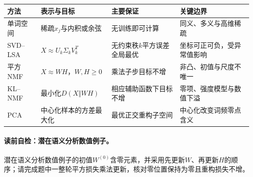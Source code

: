 \begin{comparisonbox}
\small
\begin{tabularx}{\linewidth}{@{}l X X X@{}}
\toprule 方法 & 表示与目标 & 主要保证 & 关键边界\\ \midrule
单词空间 & 稀疏$x_j$与内积或余弦 & 无训练即可计算 & 同义、多义与高维稀疏\\
SVD--LSA & $X\approx U_k\Sigma_kV_k^T$ & 无约束秩$k$平方误差全局最优 & 坐标可正可负，受异常值影响\\
平方NMF & $X\approx WH$，$W,H\ge0$ & 乘法子步目标不增 & 非凸、初值与尺度不唯一\\
KL--NMF & 最小化$D(X\Vert WH)$ & 相应辅助函数下目标不增 & 零项、强度模型与数值下溢\\
PCA & 中心化样本的方差最大化 & 最优正交重构子空间 & 中心化改变词频零点含义\\
\bottomrule
\end{tabularx}
\end{comparisonbox}

\paragraph{读前自检：潜在语义分析数值例子。}潜在语义分析数值例子的初值$W^{(0)}$含零元素，并采用先更新$W$、再更新$H$的顺序；请完成题中一整轮平方损失乘法更新，核对零位置保持为零且重构损失不增。\par

